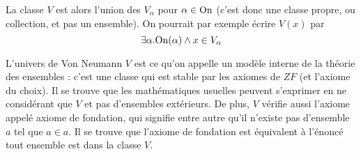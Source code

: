 La classe $V$ est alors l'union des $V_\alpha$ pour $\alpha\in\mathrm{On}$ (c'est donc une classe propre, ou collection, et pas un ensemble). On pourrait par exemple écrire $V(x)$ par $$\exists \alpha. \mathrm{On}(\alpha) \land x\in V_\alpha$$

\begin{rmk}
    L'univers de Von Neumann $V$ est ce qu'on appelle un modèle interne de la théorie des ensembles : c'est une classe qui est stable par les axiomes de $ZF$ (et l'axiome du choix). Il se trouve que les mathématiques usuelles peuvent s'exprimer en ne considérant que $V$ et pas d'ensembles extérieurs. De plus, $V$ vérifie aussi l'axiome appelé axiome de fondation, qui signifie entre autre qu'il n'existe pas d'ensemble $a$ tel que $a\in a$. Il se trouve que l'axiome de fondation est équivalent à l'énoncé \og tout ensemble est dans la classe $V$\fg{}.
\end{rmk}